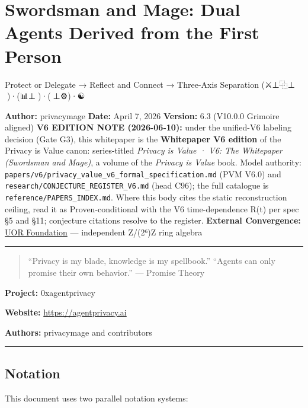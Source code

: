 \documentclass[
  11pt,
]{article}
\author{}
\date{}
\begin{document}
\section{Swordsman and Mage: Dual Agents Derived from the First
Person}\label{swordsman-and-mage-dual-agents-derived-from-the-first-person}

Protect or Delegate → Reflect and Connect → Three-Axis Separation
(⚔️⊥⿻⊥🧙)·(📊⊥🔮)·(🧠⊥⚙️)·☯️🔷 🙂

\textbf{Author:} privacymage \textbf{Date:} April 7, 2026
\textbf{Version:} 6.3 (V10.0.0 Grimoire aligned) \textbf{V6 EDITION NOTE
(2026-06-10):} under the unified-V6 labeling decision (Gate G3), this
whitepaper is the \textbf{Whitepaper V6 edition} of the Privacy is Value
canon: series-titled \emph{Privacy is Value · V6: The Whitepaper
(Swordsman and Mage)}, a volume of the \emph{Privacy is Value} book.
Model authority:
\texttt{papers/v6/privacy\_value\_v6\_formal\_specification.md} (PVM
V6.0) and \texttt{research/CONJECTURE\_REGISTER\_V6.md} (head C96); the
full catalogue is \texttt{reference/PAPERS\_INDEX.md}. Where this body
cites the static reconstruction ceiling, read it as Proven-conditional
with the V6 time-dependence R(t) per spec §5 and §11; conjecture
citations resolve to the register. \textbf{External Convergence:}
\href{https://github.com/UOR-Foundation}{UOR Foundation} --- independent
Z/(2⁶)Z ring algebra

\begin{center}\rule{0.5\linewidth}{0.5pt}\end{center}

\begin{quote}
``Privacy is my blade, knowledge is my spellbook.'' ``Agents can only
promise their own behavior.'' --- Promise Theory
\end{quote}

\textbf{Project:} \textbar{} 0xagentprivacy

\textbf{Website:} \textbar{} \url{https://agentprivacy.ai}

\textbf{Authors:} \textbar{} privacymage and contributors

\begin{center}\rule{0.5\linewidth}{0.5pt}\end{center}

\subsection{Notation}\label{notation}

This document uses two parallel notation systems:
\end{document}
